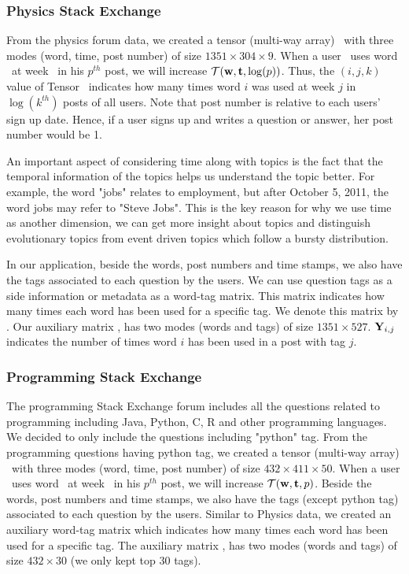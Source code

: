 \subsubsection{\textbf{Physics Stack Exchange}}
 From the physics forum data, we created a tensor 
(multi-way array) \tensor\ with three modes (word, time, post number) of size $1351  \times 304 \times 9$.
When a user \user\ uses word \word\ at week \tim\ in his $p^{th}$ post, we will increase ${\mathbf{\mathcal{T}}} ( {\mathbf{w}},{\mathbf{t}}, \log(p))$.
Thus, the $(i,j,k)$ value of Tensor \tensor\ indicates how many times word $i$ was used at week $j$ in $\log(k^{th})$ posts of
all users. Note that post number is relative to each users' sign up date. Hence, if a user
signs up and writes a question or answer, her post number would be 1.

An important aspect of considering time along with topics is the fact that the temporal information of
the topics helps us understand the topic better. For example, the word "jobs" relates to employment,
but after  October 5, 2011, the word jobs may refer to "Steve Jobs". This is the key reason for why
we use time as another dimension, we can get more insight about topics and distinguish evolutionary
topics from event driven topics which follow a bursty distribution.

In our application, beside the words, post numbers and time stamps, we also have the tags associated
to each question by the users. We can use question tags as a side information or metadata as a word-tag
matrix. This matrix indicates how many times each word has been used for a specific tag. We denote this
matrix by \sideMatrix. Our auxiliary matrix \sideMatrix, has two modes (words and tags) of size
$1351 \times 527$.  ${\mathbf{Y}}_{i,j}$  indicates the number of times word $i$ has been used in a post
with tag $j$.

\subsubsection{\textbf{Programming Stack Exchange}}
The programming Stack Exchange forum includes all the questions related to programming including Java, Python, C, R and other programming languages. We decided to only include the questions including "python" tag.  
From the programming questions having python tag, we created a tensor 
(multi-way array) \tensor\ with three modes (word, time, post number) of size $432  \times 411 \times 50$.
When a user \user\ uses word \word\ at week \tim\ in his $p^{th}$ post, we will increase ${\mathbf{\mathcal{T}}} ( {\mathbf{w}},{\mathbf{t}}, p)$. Beside the words, post numbers and time stamps, we also have the tags (except python tag) associated to each question by the users.  Similar to Physics data, we created an auxiliary word-tag matrix which indicates how many times each word has been used for a specific tag. The auxiliary matrix \sideMatrix, has two modes (words and tags) of size
$432 \times 30$ (we only kept top 30 tags). 



